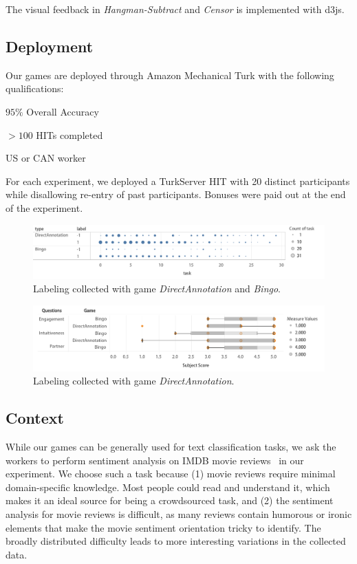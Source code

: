 \documentclass[chi_draft]{sigchi}
\begin{document}
The visual feedback in \emph{Hangman-Subtract} and \emph{Censor} is implemented with d3js.

\subsection{Deployment}
Our games are deployed through Amazon Mechanical Turk with the following qualifications:
\begin{compactitem}
\item $95\%$ Overall Accuracy
\item $> 100$ HITs completed
\item US or CAN worker
\end{compactitem}

For each experiment, we deployed a TurkServer HIT with 20 distinct participants while disallowing  re-entry of past participants. Bonuses were paid out at the end of the experiment. 

\begin{figure}[t]
\includegraphics[width=\linewidth]{figures/label.pdf}
\caption{Labeling collected with game \emph{DirectAnnotation} and \emph{Bingo}.}
\label{fig:direct-label}
\end{figure}


\begin{figure}[t]
\includegraphics[width=\linewidth]{figures/interview.pdf}
\caption{Labeling collected with game \emph{DirectAnnotation}.}
\label{fig:interview}
\end{figure}

\subsection{Context} 
While our games can be generally used for text classification tasks, we ask the workers to perform sentiment analysis on IMDB movie reviews~\cite{alsallakh2014visual} in our experiment. 
We choose such a task because 
(1) movie reviews require minimal domain-specific knowledge. Most people could read and understand it, which makes it an ideal source for being a crowdsourced task, and
(2) the sentiment analysis for movie reviews is difficult, as many reviews contain humorous or ironic elements that make the movie sentiment orientation tricky to identify. The broadly distributed difficulty leads to more interesting variations in the collected data.
\end{document}
